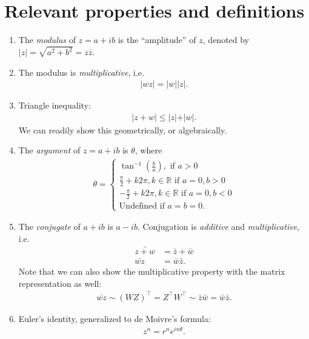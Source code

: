 \documentclass{book}
\theoremstyle{definition}
\newcommand{\R}{\mathbb{R}}
\begin{document}
\section{Relevant properties and definitions}
\begin{enumerate}
	\item The \textit{modulus} of $z = a+ib$ is the ``amplitude'' of $z$, denoted by $\vert z \vert = \sqrt{a^2 + b^2} = z\bar{z}$. 
	\item The modulus is \textit{multiplicative}, i.e. 
	\begin{align*}
	\vert wz \vert = \vert w \vert \vert z \vert.
	\end{align*}
	\item Triangle inequality:
	\begin{align*}
	\vert z + w \vert \leq \vert z \vert + \vert w \vert.
	\end{align*}
	We can readily show this geometrically, or algebraically. 
	\item The \textit{argument} of $z = a+ib$ is $\theta$, where
	\begin{align*}
	\theta = 
	\begin{cases}
	\tan^{-1}\left( \frac{b}{a}\right), \text{ if } a > 0\\
	\frac{\pi}{2} + k2\pi, k\in\R \text{ if } a = 0, b > 0\\
	-\frac{\pi}{2} + k2\pi, k\in\R \text{ if } a = 0, b < 0\\
	\text{Undefined if } a=b=0.
	\end{cases}
	\end{align*} 
	\item The \textit{conjugate} of $a+ib$ is $a-ib$. Conjugation is \textit{additive} and \textit{multiplicative}, i.e.
	\begin{align*}
	\bar{z+w} &= \bar{z} + \bar{w}\\
	\bar{wz} &= \bar{w}\bar{z}.
	\end{align*}
	Note that we can also show the multiplicative property with the matrix representation as well:
	\begin{align*}
	\bar{wz} \sim (WZ)^\top = Z^\top W^\top \sim \bar{z}\bar{w} = \bar{w}\bar{z}.
	\end{align*}
	\item Euler's identity, generalized to de Moivre's formula:
	\begin{align*}
	z^n = r^ne^{in\theta}.
	\end{align*}
\end{enumerate}
\end{document}
